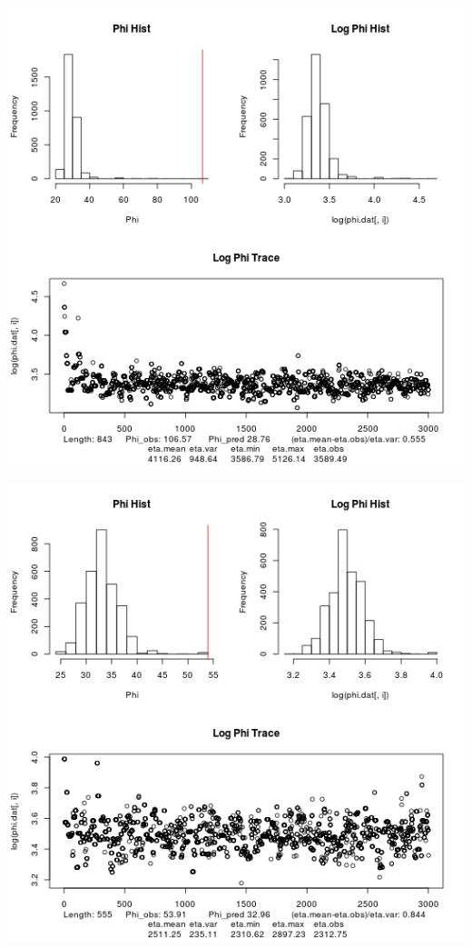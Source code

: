 \documentclass{article}
\begin{document}
 	\includegraphics[scale=0.5]{../chosen_100/3000_steps/BIS10/lnorm_prop/hist/8_phi_hist.png}
 	
 	\includegraphics[scale=0.5]{../chosen_100/3000_steps/BIS10/lnorm_prop/hist/43_phi_hist.png}
 	 	
\end{document}
